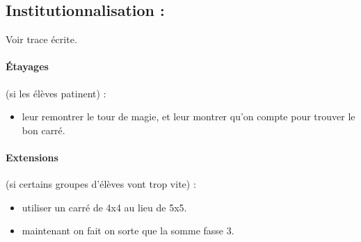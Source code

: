 \documentclass[12pt, a4paper]{article}
\begin{document}
	
\subsection*{Institutionnalisation :}
	
	Voir trace écrite.
	
	\paragraph*{Étayages} (si les élèves patinent) :
	\begin{itemize}
		\item leur remontrer le tour de magie, et leur montrer qu'on compte pour trouver le bon carré. 
	\end{itemize}
	
	\paragraph*{Extensions} (si certains groupes d'élèves vont trop vite) :
	\begin{itemize}
		\item utiliser un carré de 4x4 au lieu de 5x5.
		\item maintenant on fait on sorte que la somme fasse 3.
	\end{itemize}
\end{document}
